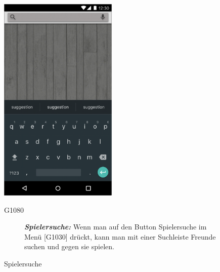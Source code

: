 \documentclass[parskip=full]{scrartcl}
\begin{document}
\begin{figure}[htp]
	\begin{minipage}[t]{6cm}
		\vspace{0pt}
		\includegraphics[height=100mm]{spielersuche.png}
		\caption{Spielersuche}
		\label{fig:Spielersuche}
	\end{minipage}
	\hfill
	\begin{minipage}[t]{6cm}
		\vspace{0pt}
		\begin{description}
			\item[G1080] \textbf{\textit{Spielersuche: }} Wenn man auf den Button Spielersuche im Menü [G1030] drückt, kann man mit einer Suchleiste Freunde suchen und gegen sie spielen.
		\end{description}
	\end{minipage}
\end{figure}
\end{document}
